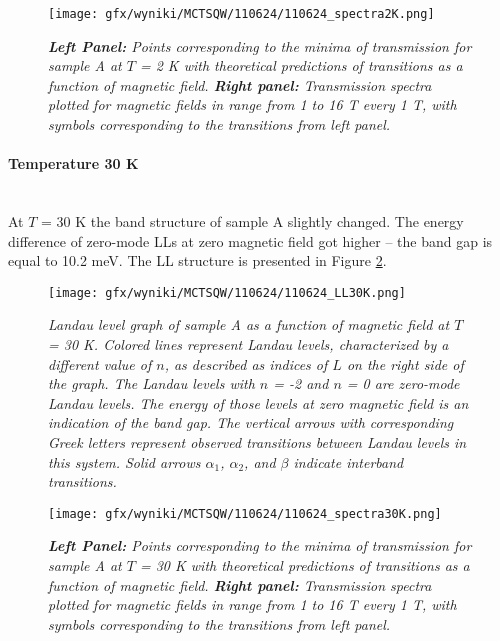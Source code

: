 \documentclass[titlepage,a4paper]{book}
\newcommand{\wciecie}{\quad\phantom{v}}
\newcommand{\myparagraph}[1]{\paragraph{#1}\mbox{}\\}
\begin{document}
\begin{figure}[ht]
	\centering
	\texttt{[image: gfx/wyniki/MCTSQW/110624/110624\_spectra2K.png]}
	\vspace{-10pt}
	\caption{\textit{\textbf{Left Panel:} Points corresponding to the minima of transmission for sample A at $T$ = 2 K with theoretical predictions of transitions as a function of magnetic field. \textbf{Right panel:} Transmission spectra plotted for magnetic fields in range from 1 to 16 T every 1 T, with symbols corresponding to the transitions from left panel.}}
	\label{fig:Spectra_110624_2K}
\end{figure}

\clearpage
\myparagraph{Temperature 30 K}
\wciecie
At $T$ = 30 K the band structure of sample A slightly changed. The energy difference of zero-mode LLs at zero magnetic field got higher -- the band gap is equal to 10.2 meV. The LL structure is presented in Figure \ref{fig:LL_110624_30K}.

\begin{figure}[ht]
	\centering
	\texttt{[image: gfx/wyniki/MCTSQW/110624/110624\_LL30K.png]}
	\vspace{-10pt}
	\caption{\textit{Landau level graph of sample A as a function of magnetic field at $T$ = 30 K. Colored lines represent Landau levels, characterized by a different value of $n$, as described as indices of $L$ on the right side of the graph. The Landau levels with $n$ = -2 and $n$ = 0 are zero-mode Landau levels. The energy of those levels at zero magnetic field is an indication of the band gap. The vertical arrows with corresponding Greek letters represent observed transitions between Landau levels in this system. Solid arrows $\alpha_1$, $\alpha_2$, and $\beta$ indicate interband transitions.}}
	\label{fig:LL_110624_30K}
\end{figure}

\begin{figure}[ht]
	\centering
	\texttt{[image: gfx/wyniki/MCTSQW/110624/110624\_spectra30K.png]}
	\vspace{-10pt}
	\caption{\textit{\textbf{Left Panel:} Points corresponding to the minima of transmission for sample A at $T$ = 30 K with theoretical predictions of transitions as a function of magnetic field. \textbf{Right panel:} Transmission spectra plotted for magnetic fields in range from 1 to 16 T every 1 T, with symbols corresponding to the transitions from left panel.}}
	\label{fig:Spectra_110624_30K}
\end{figure}
\end{document}
